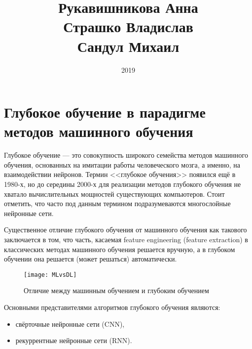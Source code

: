 \documentclass[specialist,
               substylefile = spbu.rtx,
               subf, 
               colorlinks=true, 12pt]{disser}
\begin{document}

\title{Рукавишникова Анна\\ Страшко Владислав\\ Сандул Михаил}
\author{}

\date{2019}

\maketitle
\tableofcontents

\newpage

\section{Глубокое обучение в парадигме методов машинного обучения}

Глубокое обучение --- это совокупность широкого семейства методов машинного обучения, основанных на имитации работы человеческого мозга, а именно, на взаимодействии нейронов. Термин <<глубокое обучения>> появился ещё в 1980-х, но до середины 2000-х для реализации методов глубокого обучения не хватало вычислительных мощностей существующих компьютеров. Стоит отметить, что часто под данным термином подразумеваются многослойные нейронные сети.


Существенное отличие глубокого обучения от машинного обучения как такового заключается в том, что часть, касаемая feature engineering (feature extraction) в классических методах машинного обучения решается вручную, а в глубоком обучении она решается (может решаться) автоматически.

\begin{figure}[!h]
\begin{center}
\texttt{[image: MLvsDL]}
\end{center}
\caption{Отличие между машинным обучением и глубоким обучением}
\end{figure}


Основными представителями алгоритмов глубокого обучения являются:
\begin{itemize}
\item свёрточные нейронные сети (CNN),
\item рекуррентные нейронные сети (RNN).
\end{itemize}
\end{document}
